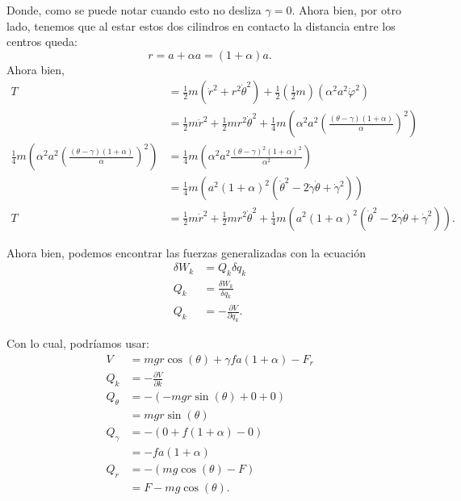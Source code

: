 \documentclass{report}
\begin{document}
Donde, como se puede notar cuando esto no desliza $\gamma = 0$. Ahora bien, por otro lado, tenemos que al estar estos dos cilindros en contacto la distancia entre los centros queda: \[
r = a + \alpha a = \left( 1 + \alpha \right) a
.\] Ahora bien,
\begin{align*}
  T &= \frac{1}{2}m\left( \dot{r}^2 + r^2\dot{\theta}^2 \right) + \frac{1}{2}\left( \frac{1}{2}m \right) \left( \alpha^2 a^2 \dot{\varphi}^2 \right)  \\
    &= \frac{1}{2}m\dot{r}^2 + \frac{1}{2}m r^2\dot{\theta}^2 + \frac{1}{4}m\left( \alpha^2 a^2 \left( \frac{\left( \theta - \gamma \right)\left( 1 + \alpha \right) }{\alpha} \right)^2 \right) \\ 
    \frac{1}{4} m \left( \alpha^2 a^2 \left( \frac{\left( \theta - \gamma \right) \left( 1 + \alpha \right) }{\alpha} \right)^2 \right) &= \frac{1}{4}m \left( \alpha^2 a^2 \frac{\left( \theta - \gamma \right)^2 \left( 1 + \alpha \right)^2}{\alpha^2} \right)  \\
    &=  \frac{1}{4}m \left( a^2 \left( 1 + \alpha \right)^2 \left( \dot{\theta}^2 - 2\dot{\gamma}\dot{\theta} + \dot{\gamma}^2 \right)  \right) \\
    T &= \frac{1}{2}m\dot{r}^2 + \frac{1}{2}m r^2\dot{\theta}^2 +\frac{1}{4}m \left( a^2 \left( 1 + \alpha \right)^2 \left( \dot{\theta}^2 - 2\dot{\gamma}\dot{\theta} + \dot{\gamma}^2 \right)  \right)
.\end{align*}

Ahora bien, podemos encontrar las fuerzas generalizadas con la ecuación
\begin{align*}
  \delta W_k &= Q_k \delta q_k \\
  Q_k &= \frac{\delta W_k}{\delta q_k} \\
  Q_k &= - \frac{\partial V}{\partial q_k}
.\end{align*}

Con lo cual, podríamos usar:
\begin{align*}
  V &= mgr\cos\left( \theta \right) + \gamma fa\left( 1 + \alpha \right) - F_r  \\
  Q_k &= - \frac{\partial V}{\partial k}  \\
  Q_\theta &= - \left( - mgr \sin\left( \theta \right) + 0 + 0 \right)  \\
  &= mgr \sin\left( \theta \right)  \\
  Q_\gamma &= - \left( 0 + f\left( 1 + \alpha \right) - 0 \right)  \\
  &= -fa\left( 1 + \alpha \right)  \\
  Q_r &= - \left( mg\cos\left( \theta \right) - F\right)  \\
  &= F - mg\cos\left( \theta \right)
.\end{align*}
\end{document}
